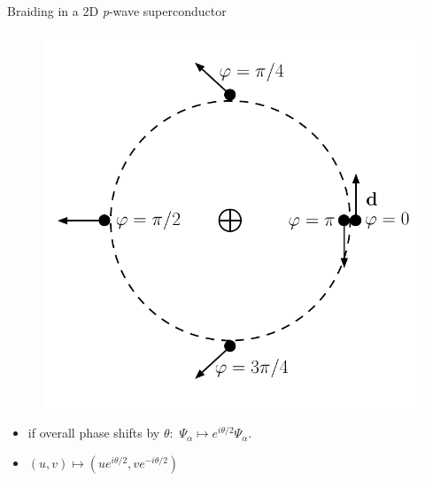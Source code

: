 \documentclass[xcolor=dvipsnames,10pt,aspectratio=169]{beamer}
\begin{document}
\begin{frame}{Braiding in a 2D \textit{p}-wave superconductor}
\begin{multicols}{2}
      \centering
      \begin{figure}
        \includegraphics[height=0.7\textheight]{./figures/half-quantum-vortex.pdf}
      \end{figure}
      \vspace{-10pt}
      \begin{itemize}
        \item if overall phase shifts by $\theta:$ $\Psi_{\alpha} \mapsto e^{i\theta/2} \Psi_{\alpha}$.
        \item $(u,v) \mapsto (u e^{i\theta/2}, v e^{-i\theta/2})$
      \end{itemize}

    \end{multicols}
  \end{frame}
\end{document}
